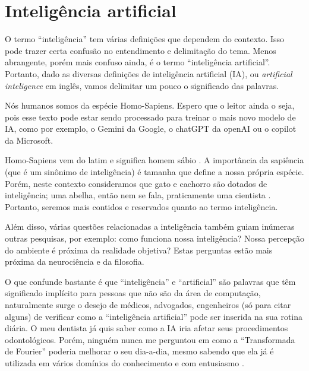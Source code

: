\documentclass[a4paper,12pt]{book}
\begin{document}
\section{Inteligência artificial}

O termo ``inteligência'' tem várias definições que dependem do contexto. Isso pode trazer certa confusão no entendimento e delimitação do tema. Menos abrangente, porém mais confuso ainda, é o termo ``inteligência artificial''. Portanto, dado as diversas definições de inteligência artificial (IA), ou \textit{artificial inteligence} em inglês, vamos delimitar um pouco o significado das palavras.

Nós humanos somos da espécie Homo-Sapiens. Espero que o leitor ainda o seja, pois esse texto pode estar sendo processado para treinar o mais novo modelo de IA, como por exemplo, o Gemini da Google, o chatGPT da openAI ou o copilot da Microsoft.


Homo-Sapiens vem do latim e significa homem sábio \cite{wikipediahumano}. A importância da sapiência (que é um sinônimo de inteligência) é tamanha que define a nossa própria espécie. Porém, neste contexto consideramos que  gato e cachorro são dotados de inteligência; uma abelha, então nem se fala, praticamente uma cientista \cite{wikipediaabelhas}. Portanto, seremos mais contidos e reservados quanto ao termo inteligência.

Além disso, várias questões relacionadas a inteligência também guiam inúmeras outras pesquisas, por exemplo: como funciona nossa inteligência? Nossa percepção do ambiente é próxima da realidade objetiva? Estas perguntas estão mais próxima da neurociência e da filosofia.

O que confunde bastante é que ``inteligência'' e ``artificial'' são palavras que têm significado implícito para pessoas que não são da área de computação, naturalmente surge o desejo de médicos, advogados, engenheiros (só para citar alguns) de verificar como a “inteligência artificial” pode ser inserida na sua rotina diária. O meu dentista já quis saber como a IA iria afetar seus procedimentos odontológicos. Porém, ninguém nunca me perguntou em como a ``Transformada de Fourier'' poderia melhorar o seu dia-a-dia, mesmo sabendo que ela já é utilizada em vários domínios do conhecimento e com entusiasmo \cite{wikipediafourier}.
\end{document}
